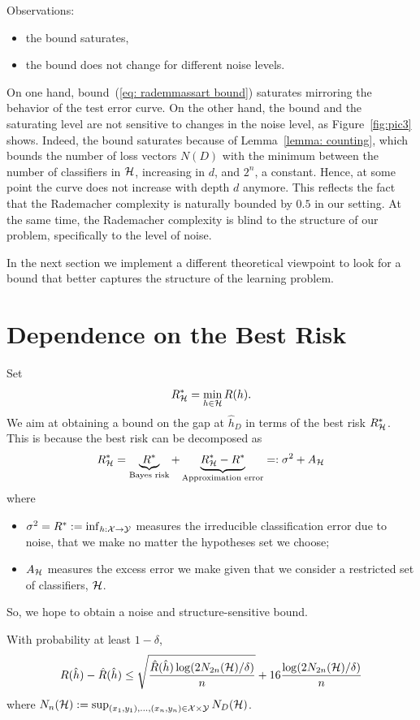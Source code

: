 \documentclass[reqno]{amsart}
\begin{document}
Observations:
\begin{itemize}
    \item[$\triangleright$] the bound saturates,
    \item[$\triangleright$] the bound does not change for different noise levels.
\end{itemize}

On one hand, bound~(\ref{eq: rademmassart bound}) saturates mirroring the behavior of the test error curve. On the other hand, the bound and the saturating level are not sensitive to changes in the noise level, as Figure~\ref{fig:pic3} shows. Indeed, the bound saturates because of Lemma~\ref{lemma: counting}, which bounds the number of loss vectors $N(D)$ with the minimum between the number of classifiers in $\mathcal{H}$, increasing in $d$, and $2^n$, a constant. Hence, at some point the curve does not increase with depth $d$ anymore. This reflects the fact that the Rademacher complexity is naturally bounded by $0.5$ in our setting. At the same time, the Rademacher complexity is blind to the structure of our problem, specifically to the level of noise.

In the next section we implement a different theoretical viewpoint to look for a bound that better captures the structure of the learning problem.

\section{Dependence on the Best Risk}\label{sec: bestrisk}
Set 
\[
R^*_{\mathcal{H}} = \min_{h\in\mathcal{H}} R(h).
\]
We aim at obtaining a bound on the gap at $\hat h_D$ in terms of the best risk $R^*_{\mathcal{H}}$. This is because the best risk can be decomposed as 
\[
R^*_{\mathcal{H}} = \underbrace{R^*}_{\text{Bayes risk}} + \underbrace{R^*_{\mathcal{H}} - R^*}_{\text{Approximation error}} =: \sigma^2 + A_{\mathcal{H}}
\]
where
\begin{itemize}
\item $\sigma^2 = R^* := \inf_{h:\mathcal{X}\to\mathcal{Y}}$ measures the irreducible classification error due to noise, that we make no matter the hypotheses set we choose;
\item $A_{\mathcal{H}}$ measures the excess error we make given that we consider a restricted set of classifiers, $\mathcal{H}$.
\end{itemize}

So, we hope to obtain a noise and structure-sensitive bound. 

\begin{theorem}\label{thm: bound emprisk}
    With probability at least $1-\delta$,
    \[
    R(\hat h) - \hat R(\hat h) \le \sqrt{\frac{\hat R(\hat h)\log(2N_{2n}(\mathcal{H})/\delta)}{n}} + 16\frac{\log(2N_{2n}(\mathcal{H})/\delta)}{n}
    \]
    where $N_{n}(\mathcal{H}) := \sup_{(x_1,y_1), \ldots,(x_{n},y_{n}) \in \mathcal{X} \times \mathcal{Y}} N_D(\mathcal{H})$.
\end{theorem}
\end{document}
